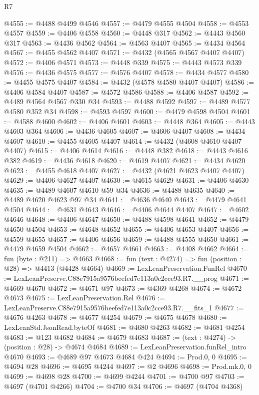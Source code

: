 \begin{lexlean}{R7}
\begin{coremodule}
@4555 := @4488 @4499 @4546
@4557 := @4479 @4555 @4504
@4558 := @4553 @4557
@4559 := @4406 @4558
@4560 := @4448 @317
@4562 := @4443 @4560 @317
@4563 := @4436 @4562
@4564 := @4563 @4407
@4565 := @4434 @4564
@4567 := @4455 @4562 @4407
@4571 := @4432 (@4565 @4567 @4407 @4407)
@4572 := @4406 @4571
@4573 := @4448 @339
@4575 := @4443 @4573 @339
@4576 := @4436 @4575
@4577 := @4576 @4407
@4578 := @4434 @4577
@4580 := @4455 @4575 @4407
@4584 := @4432 (@4578 @4580 @4407 @4407)
@4586 := @4406 @4584 @4407
@4587 := @4572 @4586
@4588 := @4406 @4587
@4592 := @4489 @4564 @4567 @330 @34
@4593 := @4488 @4592
@4597 := @4489 @4577 @4580 @352 @34
@4598 := @4593 @4597
@4600 := @4479 @4598 @4504
@4601 := @4588 @4600
@4602 := @4406 @4601
@4603 := @4448 @364
@4605 := @4443 @4603 @364
@4606 := @4436 @4605
@4607 := @4606 @4407
@4608 := @4434 @4607
@4610 := @4455 @4605 @4407
@4614 := @4432 (@4608 @4610 @4407 @4407)
@4615 := @4406 @4614
@4616 := @4448 @382
@4618 := @4443 @4616 @382
@4619 := @4436 @4618
@4620 := @4619 @4407
@4621 := @4434 @4620
@4623 := @4455 @4618 @4407
@4627 := @4432 (@4621 @4623 @4407 @4407)
@4629 := @4406 @4627 @4407
@4630 := @4615 @4629
@4631 := @4406 @4630
@4635 := @4489 @4607 @4610 @59 @34
@4636 := @4488 @4635
@4640 := @4489 @4620 @4623 @97 @34
@4641 := @4636 @4640
@4643 := @4479 @4641 @4504
@4644 := @4631 @4643
@4646 := @4406 @4644 @4407
@4647 := @4602 @4646
@4648 := @4406 @4647
@4650 := @4488 @4598 @4641
@4652 := @4479 @4650 @4504
@4653 := @4648 @4652
@4655 := @4406 @4653 @4407
@4656 := @4559 @4655
@4657 := @4406 @4656
@4659 := @4488 @4555 @4650
@4661 := @4479 @4659 @4504
@4662 := @4657 @4661
@4663 := @4408 @4662
@4664 := fun (byte : @211) => @4663
@4668 := fun (text : @4274) => fun (position : @28) => @4413 (@4428 @4664)
@4669 := LexLeanPreservation.FunRel
@4670 := LexLeanPreserve.C88e7915a9576beefed7e113a0c2cce93.R7.__prog
@4671 := @4669 @4670
@4672 := @4671 @97
@4673 := @4369 @4268
@4674 := @4672 @4673
@4675 := LexLeanPreservation.Rel
@4676 := LexLeanPreserve.C88e7915a9576beefed7e113a0c2cce93.R7.__fits_1
@4677 := @4676 @4263
@4678 := @4677 @4254
@4679 := @4675 @4678
@4680 := LexLeanStd.JsonRead.byteOf
@4681 := @4680 @4263
@4682 := @4681 @4254
@4683 := @123 @4682
@4684 := @4679 @4683
@4687 := (text : @4274) -> (position : @28) -> @4674 @4684
@4689 := LexLeanPreservation.funRel_intro @4670
@4693 := @4689 @97 @4673 @4684 @424
@4694 := Prod.{0, 0}
@4695 := @4694 @28
@4696 := @4695 @4244
@4697 := @2 @4696
@4698 := Prod.mk.{0, 0}
@4699 := @4698 @28
@4700 := @4699 @4244
@4701 := @4700 @97
@4703 := @4697 (@4701 @4266)
@4704 := @4700 @34
@4706 := @4697 (@4704 @4368)

\end{coremodule}
\end{lexlean}
